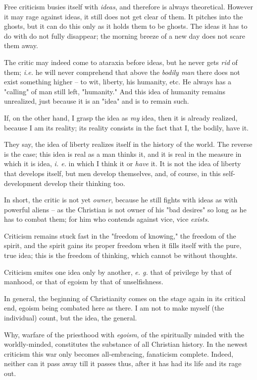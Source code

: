 Free criticism busies itself with \textit{ideas}, and therefore is always 
theoretical. However it may rage against ideas, it still does not get clear of 
them. It pitches into the ghosts, but it can do this only as it holds them to 
be ghosts. The ideas it has to do with do not fully disappear; the morning 
breeze of a new day does not scare them away.

The critic may indeed come to ataraxia before ideas, but he never gets 
\textit{rid} of them; \textit{i.e.} he will never comprehend that above the 
\textit{bodily man} there does not exist something higher -- to wit, liberty, 
his humanity, etc. He always has a "{}calling"{} of man still left, 
"{}humanity."{} And this idea of humanity remains unrealized, just because it 
is an "{}idea"{} and is to remain such.

If, on the other hand, I grasp the idea as \textit{my} idea, then it is 
already realized, because I am its reality; its reality consists in the fact 
that I, the bodily, have it.

They say, the idea of liberty realizes itself in the history of the world. The 
reverse is the case; this idea is real as a man thinks it, and it is real in 
the measure in which it is idea, \textit{i. e.} in which I think it or 
\textit{have} it. It is not the idea of liberty that develops itself, but men 
develop themselves, and, of course, in this self-development develop their 
thinking too.

In short, the critic is not yet \textit{owner}, because he still fights with 
ideas as with powerful aliens -- as the Christian is not owner of his "{}bad 
desires"{} so long as he has to combat them; for him who contends against 
vice, vice \textit{exists}.

Criticism remains stuck fast in the "{}freedom of knowing,"{} the freedom of 
the spirit, and the spirit gains its proper freedom when it fills itself with 
the pure, true idea; this is the freedom of thinking, which cannot be without 
thoughts.

Criticism smites one idea only by another, \textit{e. g.} that of privilege by 
that of manhood, or that of egoism by that of unselfishness.

In general, the beginning of Christianity comes on the stage again in its 
critical end, egoism being combated here as there. I am not to make myself 
(the individual) count, but the idea, the general.

Why, warfare of the priesthood with \textit{egoism}, of the spiritually minded 
with the worldly-minded, constitutes the substance of all Christian history. 
In the newest criticism this war only becomes all-embracing, fanaticism 
complete. Indeed, neither can it pass away till it passes thus, after it has 
had its life and its rage out.

